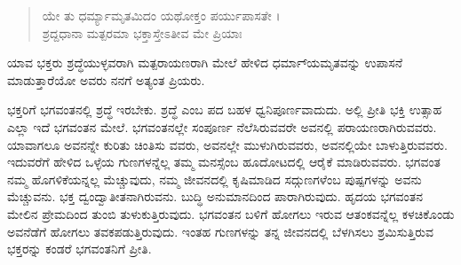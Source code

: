 \begin{verse}
ಯೇ ತು ಧರ್ಮ್ಯಾಮೃತಮಿದಂ ಯಥೋಕ್ತಂ ಪರ್ಯುಪಾಸತೇ ।\\ಶ್ರದ್ದಧಾನಾ ಮತ್ಪರಮಾ ಭಕ್ತಾಸ್ತೇಽತೀವ ಮೇ ಪ್ರಿಯಾಃ 
\end{verse}

{\small ಯಾವ ಭಕ್ತರು ಶ್ರದ್ಧೆಯುಳ್ಳವರಾಗಿ ಮತ್ಪರಾಯಣರಾಗಿ ಮೇಲೆ ಹೇಳಿದ ಧರ್ಮಾ್ಯಮೃತವನ್ನು ಉಪಾಸನೆ ಮಾಡುತ್ತಾರೆಯೋ ಅವರು ನನಗೆ ಅತ್ಯಂತ ಪ್ರಿಯರು.}

ಭಕ್ತರಿಗೆ ಭಗವಂತನಲ್ಲಿ ಶ್ರದ್ಧೆ ಇರಬೇಕು. ಶ್ರದ್ಧೆ ಎಂಬ ಪದ ಬಹಳ ಧ್ವನಿಪೂರ್ಣವಾದುದು. ಅಲ್ಲಿ ಪ್ರೀತಿ ಭಕ್ತಿ ಉತ್ಸಾಹ ಎಲ್ಲಾ ಇದೆ ಭಗವಂತನ ಮೇಲೆ. ಭಗವಂತನಲ್ಲೇ ಸಂಪೂರ್ಣ ನೆಲೆಸಿರುವವರೇ ಅವನಲ್ಲಿ ಪರಾಯಣರಾಗಿರುವವರು. ಯಾವಾಗಲೂ ಅವನನ್ನೇ ಕುರಿತು ಚಿಂತಿಸು ವವರು, ಅವನಲ್ಲೇ ಮುಳುಗಿರುವವರು, ಅವನಲ್ಲಿಯೇ ಬಾಳುತ್ತಿರುವವರು. ಇದುವರೆಗೆ ಹೇಳಿದ ಒಳ್ಳೆಯ ಗುಣಗಳನ್ನೆಲ್ಲ ತಮ್ಮ ಮನಸ್ಸೆಂಬ ಹೂದೋಟದಲ್ಲಿ ಆರೈಕೆ ಮಾಡಿರುವವರು. ಭಗವಂತ ನಮ್ಮ ಹೊಗಳಿಕೆಯನ್ನಲ್ಲ ಮೆಚ್ಚುವುದು, ನಮ್ಮ ಜೀವನದಲ್ಲಿ ಕೃಷಿಮಾಡಿದ ಸದ್ಗುಣಗಳೆಂಬ ಪುಷ್ಪಗಳನ್ನು ಅವನು ಮೆಚ್ಚುವನು. ಭಕ್ತ ದ್ವಂದ್ವಾತೀತನಾಗಿರುವನು. ಬುದ್ಧಿ ಅನುಮಾನದಿಂದ ಪಾರಾಗಿರುವುದು. ಹೃದಯ ಭಗವಂತನ ಮೇಲಿನ ಪ್ರೇಮದಿಂದ ತುಂಬಿ ತುಳುಕುತ್ತಿರುವುದು. ಭಗವಂತನ ಬಳಿಗೆ ಹೋಗಲು ಇರುವ ಆತಂಕವನ್ನೆಲ್ಲ ಕಳಚಿಕೊಂಡು ಅವನೆಡೆಗೆ ಹೋಗಲು ತವಕಪಡುತ್ತಿರುವುದು. ಇಂತಹ ಗುಣಗಳನ್ನು ತನ್ನ ಜೀವನದಲ್ಲಿ ಬೆಳಗಿಸಲು ಶ್ರಮಿಸುತ್ತಿರುವ ಭಕ್ತರನ್ನು ಕಂಡರೆ ಭಗವಂತನಿಗೆ ಪ್ರೀತಿ.

